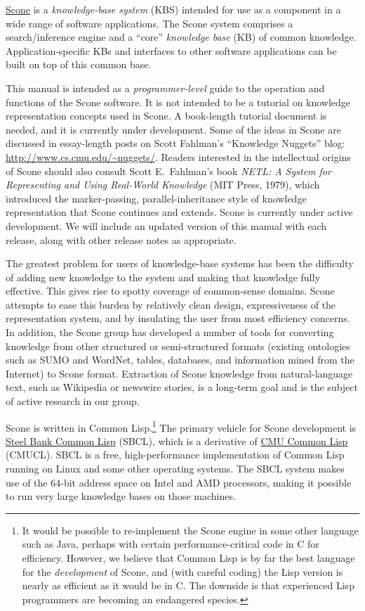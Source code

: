 \documentclass[titlepage,twoside,openright,11pt]{article}
\begin{document}
\href{http://www.cs.cmu.edu/~sef/scone}{Scone} is a \emph{knowledge-base
system} (KBS) intended for use as a component in a wide range of
software applications. The Scone system comprises a search/inference
engine and a ``core'' \emph{knowledge base} (KB) of common knowledge.
Application-specific KBs and interfaces to other software applications
can be built on top of this common base.

This manual is intended as a \emph{programmer-level} guide to the
operation and functions of the Scone software. It is not intended to be
a tutorial on knowledge representation concepts used in Scone. A
book-length tutorial document is needed, and it is currently under
development. Some of the ideas in Scone are discussed in essay-length
posts on Scott Fahlman's ``Knowledge Nuggets'' blog:
\url{http://www.cs.cmu.edu/~nuggets/}. Readers interested in the
intellectual origins of Scone should also consult Scott E.\ Fahlman's
book \emph{NETL: A System for Representing and Using Real-World
Knowledge} (MIT Press, 1979), which introduced the marker-passing,
parallel-inheritance style of knowledge representation that Scone
continues and extends. Scone is currently under active
development. We will include an updated version of this manual with each
release, along with other release notes as appropriate.

The greatest problem for users of knowledge-base systems has been the
difficulty of adding new knowledge to the system and making that
knowledge fully effective. This gives rise to spotty coverage of
common-sense domains. Scone attempts to ease this burden by relatively
clean design, expressiveness of the representation system, and by
insulating the user from most efficiency concerns. In addition, the
Scone group has developed a number of tools for converting knowledge
from other structured or semi-structured formats (existing ontologies
such as SUMO and WordNet, tables, databases, and information mined from
the Internet) to Scone format. Extraction of Scone knowledge from
natural-language text, such as Wikipedia or newswire stories, is a
long-term goal and is the subject of active research in our group.

Scone is written in Common Lisp.\footnote{It would be possible to
  re-implement the Scone engine in some other language such as Java,
  perhaps with certain performance-critical code in C for efficiency.
  However, we believe that Common Lisp is by far the best language for
  the \emph{development} of Scone, and (with careful coding) the Lisp
  version is nearly as efficient as it would be in C. The downside is
  that experienced Lisp programmers are becoming an endangered species.}
The primary vehicle for Scone development is
\href{http://www.sbcl.org/}{Steel Bank Common Lisp} (SBCL), which is a
derivative of \href{http://www.cons.org/cmucl/}{CMU Common Lisp}
(CMUCL). SBCL is a free, high-performance implementation of Common Lisp
running on Linux and some other operating systems. The SBCL system makes
use of the 64-bit address space on Intel and AMD processors, making it
possible to run very large knowledge bases on those machines.
\end{document}
